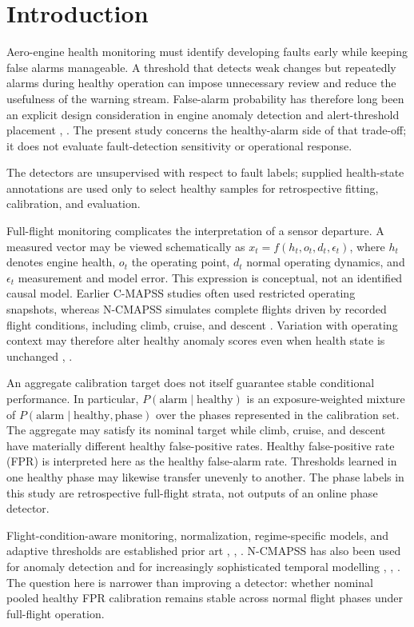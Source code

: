 \documentclass[preprint,12pt]{elsarticle}
\begin{document}
\section{Introduction}\label{introduction}

Aero-engine health monitoring must identify developing faults early while keeping false alarms manageable. A threshold that detects weak changes but repeatedly alarms during healthy operation can impose unnecessary review and reduce the usefulness of the warning stream. False-alarm probability has therefore long been an explicit design consideration in engine anomaly detection and alert-threshold placement \cite{ref2}, \cite{ref11}. The present study concerns the healthy-alarm side of that trade-off; it does not evaluate fault-detection sensitivity or operational response.

The detectors are unsupervised with respect to fault labels; supplied health-state annotations are used only to select healthy samples for retrospective fitting, calibration, and evaluation.

Full-flight monitoring complicates the interpretation of a sensor departure. A measured vector may be viewed schematically as \(x_t=f(h_t,o_t,d_t,\epsilon_t)\), where \(h_t\) denotes engine health, \(o_t\) the operating point, \(d_t\) normal operating dynamics, and \(\epsilon_t\) measurement and model error. This expression is conceptual, not an identified causal model. Earlier C-MAPSS studies often used restricted operating snapshots, whereas N-CMAPSS simulates complete flights driven by recorded flight conditions, including climb, cruise, and descent \cite{ref1}. Variation with operating context may therefore alter healthy anomaly scores even when health state is unchanged \cite{ref2}, \cite{ref10}.

An aggregate calibration target does not itself guarantee stable conditional performance. In particular, \(P(\mathrm{alarm}\mid\mathrm{healthy})\) is an exposure-weighted mixture of \(P(\mathrm{alarm}\mid\mathrm{healthy},\mathrm{phase})\) over the phases represented in the calibration set. The aggregate may satisfy its nominal target while climb, cruise, and descent have materially different healthy false-positive rates. Healthy false-positive rate (FPR) is interpreted here as the healthy false-alarm rate. Thresholds learned in one healthy phase may likewise transfer unevenly to another. The phase labels in this study are retrospective full-flight strata, not outputs of an online phase detector.

Flight-condition-aware monitoring, normalization, regime-specific models, and adaptive thresholds are established prior art \cite{ref3}, \cite{ref4}, \cite{ref6}. N-CMAPSS has also been used for anomaly detection and for increasingly sophisticated temporal modelling \cite{ref7}, \cite{ref8}, \cite{ref9}. The question here is narrower than improving a detector: whether nominal pooled healthy FPR calibration remains stable across normal flight phases under full-flight operation.
\end{document}
